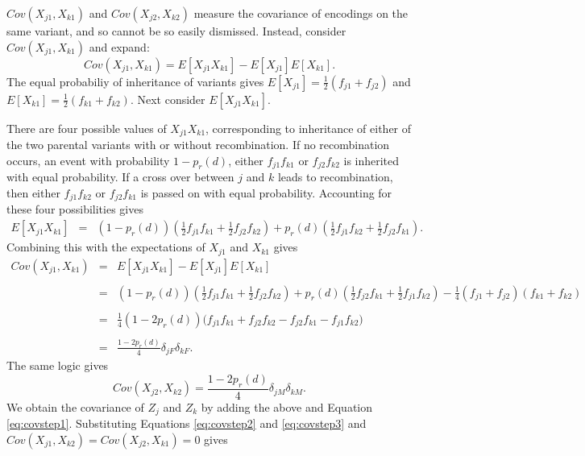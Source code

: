 \documentclass[12pt]{article}
\begin{document}
$Cov(X_{j1}, X_{k1})$ and $Cov(X_{j2}, X_{k2})$ measure the covariance of encodings on the same variant, and so cannot be so easily dismissed. Instead, consider $Cov(X_{j1}, X_{k1})$ and expand:
$$Cov(X_{j1}, X_{k1}) = E[X_{j1} X_{k1}] - E[X_{j1}]E[X_{k1}].$$
The equal probabiliy of inheritance of variants gives $E[X_{j1}] = \frac{1}{2}(f_{j1} + f_{j2})$ and $E[X_{k1}] = \frac{1}{2}(f_{k1} + f_{k2})$. Next consider $E[X_{j1} X_{k1}]$.

There are four possible values of $X_{j1} X_{k1}$, corresponding to inheritance of either of the two parental variants with or without recombination. If no recombination occurs, an event with probability $1 - p_r(d)$, either $f_{j1} f_{k1}$ or $f_{j2} f_{k2}$ is inherited with equal probability. If a cross over between $j$ and $k$ leads to recombination, then either $f_{j1} f_{k2}$ or $f_{j2} f_{k1}$ is passed on with equal probability. Accounting for these four possibilities gives
\begin{eqnarray}
  E[X_{j1} X_{k1}] & = & (1 - p_r(d)) \left ( \frac{1}{2} f_{j1} f_{k1} + \frac{1}{2} f_{j2} f_{k2} \right ) + p_r(d) \left ( \frac{1}{2} f_{j1} f_{k2} + \frac{1}{2} f_{j2} f_{k1} \right ). \nonumber
\end{eqnarray}
Combining this with the expectations of $X_{j1}$ and $X_{k1}$ gives
\begin{eqnarray}
    Cov(X_{j1}, X_{k1}) & = & E[X_{j1} X_{k1}] - E[X_{j1}]E[X_{k1}] \nonumber\\
    & & \nonumber\\
    & = & (1 - p_r(d)) \left ( \frac{1}{2} f_{j1} f_{k1} + \frac{1}{2} f_{j2} f_{k2} \right ) + p_r(d) \left ( \frac{1}{2} f_{j2} f_{k1} + \frac{1}{2} f_{j1} f_{k2} \right ) - \frac{1}{4} (f_{j1} + f_{j2})(f_{k1} + f_{k2}) \nonumber\\
    & & \nonumber\\
    & = & \frac{1}{4} \left ( 1 - 2 p_r(d) \right ) \Big ( f_{j1}f_{k1} + f_{j2}f_{k2} - f_{j2}f_{k1} - f_{j1}f_{k2} \Big ) \nonumber\\
    & & \nonumber\\
    & = & \frac{ 1 - 2 p_r(d)}{4}  \delta_{jF} \delta_{kF}. \label{eq:covstep2}
\end{eqnarray}
The same logic gives
\begin{equation} \label{eq:covstep3}
   Cov(X_{j2}, X_{k2}) = \frac{ 1 - 2 p_r(d)}{4}  \delta_{jM} \delta_{kM}.
\end{equation}
We obtain the covariance of $Z_j$ and $Z_k$ by adding the above and Equation \ref{eq:covstep1}. Substituting Equations \ref{eq:covstep2} and \ref{eq:covstep3} and $Cov(X_{j1}, X_{k2}) = Cov(X_{j2}, X_{k1}) = 0$ gives
\end{document}
